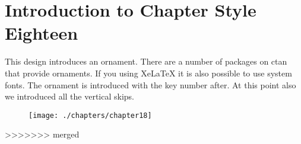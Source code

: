 \chapter{Introduction to Chapter Style Eighteen}

\parindent0pt
This design introduces an ornament. There are a number of packages on ctan that provide ornaments. If you using XeLaTeX it is also possible to use system fonts. The ornament is introduced with the key number after. At this point also we introduced all the vertical skips.
\medskip
\begin{figure}[ht]
\centering
\texttt{[image: ./chapters/chapter18]}
\end{figure}
>>>>>>> merged
